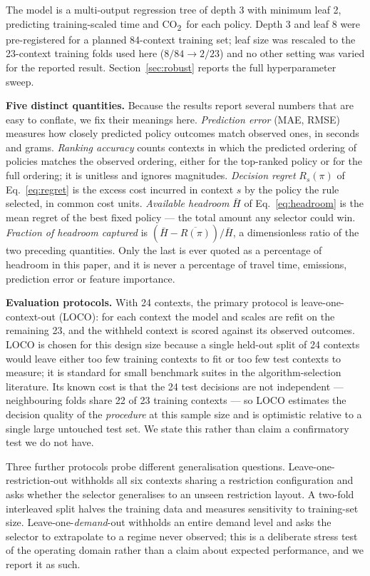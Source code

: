 \documentclass[10pt,a4paper]{article}
\newcommand{\CO}{CO\textsubscript{2}}
\begin{document}
The model is a multi-output regression tree \cite{breiman2017cart} of depth 3 with minimum leaf 2, predicting training-scaled time and \CO\ for each policy. Depth 3 and leaf 8 were pre-registered for a planned 84-context training set; leaf size was rescaled to the 23-context training folds used here ($8/84\rightarrow2/23$) and no other setting was varied for the reported result. Section~\ref{sec:robust} reports the full hyperparameter sweep.

\textbf{Five distinct quantities.} Because the results report several numbers that are easy to conflate, we fix their meanings here. \emph{Prediction error} (MAE, RMSE) measures how closely predicted policy outcomes match observed ones, in seconds and grams. \emph{Ranking accuracy} counts contexts in which the predicted ordering of policies matches the observed ordering, either for the top-ranked policy or for the full ordering; it is unitless and ignores magnitudes. \emph{Decision regret} $R_s(\pi)$ of Eq.~\eqref{eq:regret} is the excess cost incurred in context $s$ by the policy the rule selected, in common cost units. \emph{Available headroom} $\bar H$ of Eq.~\eqref{eq:headroom} is the mean regret of the best fixed policy --- the total amount any selector could win. \emph{Fraction of headroom captured} is $(\bar H-\overline{R(\pi)})/\bar H$, a dimensionless ratio of the two preceding quantities. Only the last is ever quoted as a percentage of headroom in this paper, and it is never a percentage of travel time, emissions, prediction error or feature importance.

\textbf{Evaluation protocols.} With 24 contexts, the primary protocol is leave-one-context-out (LOCO): for each context the model and scales are refit on the remaining 23, and the withheld context is scored against its observed outcomes. LOCO is chosen for this design size because a single held-out split of 24 contexts would leave either too few training contexts to fit or too few test contexts to measure; it is standard for small benchmark suites in the algorithm-selection literature. Its known cost is that the 24 test decisions are not independent --- neighbouring folds share 22 of 23 training contexts --- so LOCO estimates the decision quality of the \emph{procedure} at this sample size and is optimistic relative to a single large untouched test set. We state this rather than claim a confirmatory test we do not have.

Three further protocols probe different generalisation questions. Leave-one-restriction-out withholds all six contexts sharing a restriction configuration and asks whether the selector generalises to an unseen restriction layout. A two-fold interleaved split halves the training data and measures sensitivity to training-set size. Leave-one-\emph{demand}-out withholds an entire demand level and asks the selector to extrapolate to a regime never observed; this is a deliberate stress test of the operating domain rather than a claim about expected performance, and we report it as such.
\end{document}
